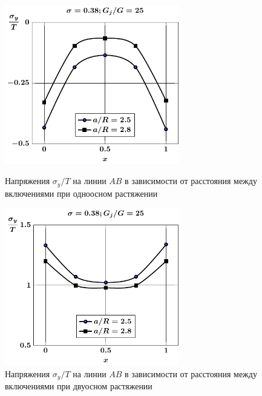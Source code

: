 \begin{russian}
\begin{figure}[h!]
\centering\footnotesize
\parbox[b]{7.5cm}{\centering\includegraphics[width=7.6cm]{periodic-spheres-inc27-a-g25-t1-sig_y.pdf}
\caption{Напряжения $\sigma_y/T$ на линии $AB$ в зависимости от расстояния между включениями при одноосном растяжении
\label{f:11:14}}}\hfil\hfil
\parbox[b]{7.5cm}{\centering\includegraphics[width=7.6cm]{periodic-spheres-inc27-a-g25-t2-sig_y.pdf}
\caption{Напряжения $\sigma_y/T$ на линии $AB$ в зависимости от расстояния между включениями при двуосном растяжении
\label{f:11:15}}}
\end{figure}


\end{russian}
